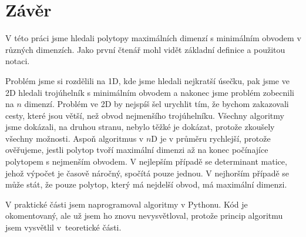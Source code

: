 \chapter*{Závěr}

V této práci jsme hledali polytopy maximálních dimenzí s minimálním obvodem v různých dimenzích. Jako první čtenář mohl vidět základní definice a použitou notaci. 

Problém jsme si rozdělili na 1D, kde jsme hledali nejkratší úsečku, pak jsme ve 2D hledali trojúhelník s minimálním obvodem  a nakonec jsme problém zobecnili na $n$ dimenzí. Problém ve 2D by nejspíš šel urychlit tím, že bychom zakazovali cesty, které jsou větší, než obvod nejmenšího trojúhelníku. Všechny algoritmy jsme dokázali, na druhou stranu, nebylo těžké je dokázat, protože zkoušely všechny možnosti. Aspoň algoritmus v $n$D je v průměru rychlejší, protože ověřujeme, jestli polytop tvoří maximální dimenzi až na konec počínajíce polytopem s nejmenším obvodem. V nejlepším případě se determinant matice, jehož výpočet je časově náročný, spočítá pouze jednou. V nejhorším případě se může stát, že pouze polytop, který má nejdelší obvod, má maximální dimenzi. 

V praktické části jsem naprogramoval algoritmy v Pythonu. Kód je okomentovaný, ale už jsem ho znovu nevysvětloval, protože  princip algoritmu jsem vysvětlil v~teoretické části. 
